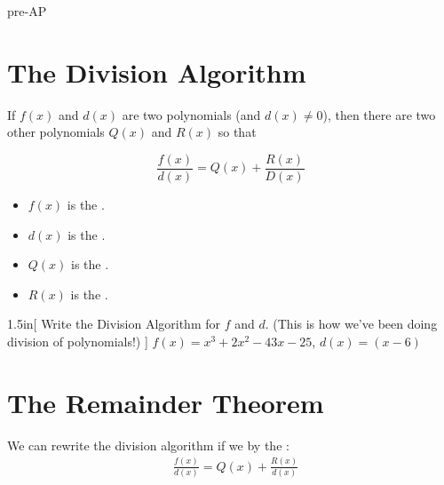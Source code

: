 \begin{taggedblock}{pre-AP}


\section{The Division Algorithm}

If $f(x)$ and $d(x)$ are two polynomials
(and $d(x) \neq 0$),
then there are two other polynomials 
$Q(x)$ and $R(x)$ 
so that
{\large
\begin{myCenteredBox}[width=2.5in]
    \begin{equation*}
        \frac{f(x)}{d(x)} = Q(x) + \frac{R(x)}{D(x)}
    \end{equation*}
\end{myCenteredBox}
}
\begin{minipage}{0.45\textwidth}
    \vspace{-1em}
    \begin{itemize}[nosep]
        \item $f(x)$ is the .
        \item $d(x)$ is the .
    \end{itemize}
\end{minipage}
\begin{minipage}{0.45\textwidth}
    \vspace{-1em}
    \begin{itemize}[nosep]
        \item $Q(x)$ is the .
        \item $R(x)$ is the .
    \end{itemize}
\end{minipage}


\begin{myWideProblem}{1.5in}[%
    Write the Division Algorithm for $f$ and $d$.
    (This is how we've been doing division of polynomials!)
    ]
    {
        $f(x) = x^3 + 2x^2 - 43x  -25 $, \qquad
        $d(x) = (x-6) $
    }
\end{myWideProblem}





\section{The Remainder Theorem}

We can rewrite the division algorithm if we  
by the :
\begin{align*}
    &\frac{f(x)}{d(x)}      = Q(x) + \frac{R(x)}{d(x)} \\
\end{align*}
\vspace{1in}


\end{taggedblock}
